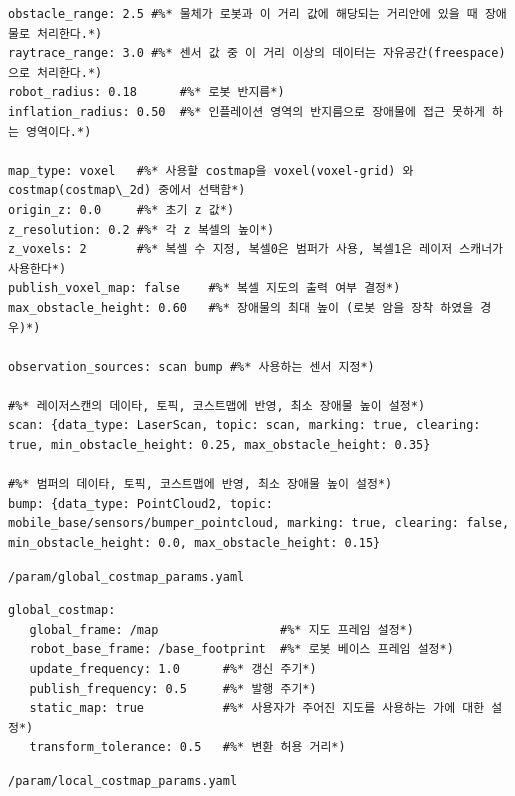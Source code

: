 \vspace{\baselineskip}
\begin{lstlisting}[language=ROS]
obstacle_range: 2.5 #%* 물체가 로봇과 이 거리 값에 해당되는 거리안에 있을 때 장애물로 처리한다.*)
raytrace_range: 3.0 #%* 센서 값 중 이 거리 이상의 데이터는 자유공간(freespace)으로 처리한다.*)
robot_radius: 0.18      #%* 로봇 반지름*)
inflation_radius: 0.50  #%* 인플레이션 영역의 반지름으로 장애물에 접근 못하게 하는 영역이다.*)

map_type: voxel   #%* 사용할 costmap을 voxel(voxel-grid) 와 costmap(costmap\_2d) 중에서 선택함*)
origin_z: 0.0     #%* 초기 z 값*)
z_resolution: 0.2 #%* 각 z 복셀의 높이*)
z_voxels: 2       #%* 복셀 수 지정, 복셀0은 범퍼가 사용, 복셀1은 레이저 스캐너가 사용한다*)
publish_voxel_map: false    #%* 복셀 지도의 출력 여부 결정*)
max_obstacle_height: 0.60   #%* 장애물의 최대 높이 (로봇 암을 장착 하였을 경우)*)

observation_sources: scan bump #%* 사용하는 센서 지정*)

#%* 레이저스캔의 데이타, 토픽, 코스트맵에 반영, 최소 장애물 높이 설정*)
scan: {data_type: LaserScan, topic: scan, marking: true, clearing: true, min_obstacle_height: 0.25, max_obstacle_height: 0.35}

#%* 범퍼의 데이타, 토픽, 코스트맵에 반영, 최소 장애물 높이 설정*)
bump: {data_type: PointCloud2, topic: mobile_base/sensors/bumper_pointcloud, marking: true, clearing: false, min_obstacle_height: 0.0, max_obstacle_height: 0.15}
\end{lstlisting}

\vspace{\baselineskip}
\begin{lstlisting}[language=ROS]
/param/global_costmap_params.yaml
\end{lstlisting}

\begin{lstlisting}[language=ROS]
global_costmap:
   global_frame: /map                 #%* 지도 프레임 설정*)
   robot_base_frame: /base_footprint  #%* 로봇 베이스 프레임 설정*)
   update_frequency: 1.0      #%* 갱신 주기*)
   publish_frequency: 0.5     #%* 발행 주기*)
   static_map: true           #%* 사용자가 주어진 지도를 사용하는 가에 대한 설정*)
   transform_tolerance: 0.5   #%* 변환 허용 거리*)
\end{lstlisting}

\begin{lstlisting}[language=ROS]
/param/local_costmap_params.yaml
\end{lstlisting}

